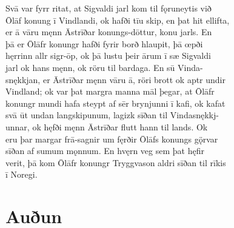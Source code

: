 \documentclass[12pt,letterpaper]{book}
\newcommand\emptypage{\clearpage{\pagestyle{empty}\cleardoublepage}}
\begin{document}
\begin{linenumbers}
Svā var fyrr ritat, at Sigvaldi jarl kom til fǫruneytis við\\
Ōlāf konung ī Vindlandi, ok hafði tīu skip, en þat hit ellifta,\\
er ā vāru męnn Āstrīðar konungs-dōttur, konu jarls.  En\\
þā er Ōlāfr konungr hafði fyrir borð hlaupit, þā œpði\\
hęrrinn allr sigr-ōp, ok þā lustu þeir ārum ī sæ Sigvaldi\\
jarl ok hans męnn, ok röru til bardaga.  En sū Vinda-\\
snękkjan, er Āstrīðar męnn vāru ā, röri brott ok aptr undir\\
Vindland; ok var þat margra manna māl þegar, at Ōlāfr\\
konungr mundi hafa steypt af sēr brynjunni ī kafi, ok kafat\\
svā ūt undan langskipunum, lagizk sīðan til Vindasnękkj-\\
unnar, ok hęfði męnn Āstrīðar flutt hann til lands.  Ok\\
eru þar margar frā-sagnir um fęrðir Ōlāfs konungs gǫ̈rvar\\
sīðan af sumum mǫnnum.  En hvęrn veg sem þat hęfir\\
verit, þā kom Ōlāfr konungr Tryggvason aldri sīðan til rīkis\\
ī Noregi.

\end{linenumbers}

\emptypage

\chapter{Auðun}
\end{document}
